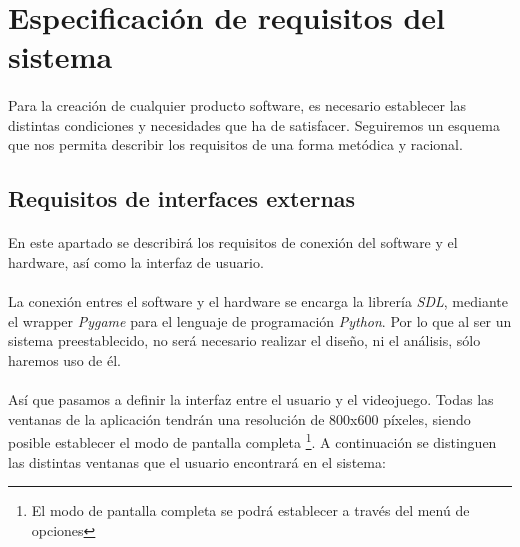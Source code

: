 \section{Especificación de requisitos del sistema}

\paragraph{}
Para la creación de cualquier producto software, es necesario establecer las distintas condiciones y necesidades que
ha de satisfacer. Seguiremos un esquema que nos permita describir los requisitos de una forma metódica y racional.

\subsection{Requisitos de interfaces externas}

\paragraph{}
En este apartado se describirá los requisitos de conexión del software y el hardware, así como la interfaz de usuario.

\paragraph{}
La conexión entres el software y el hardware se encarga la librería \emph{SDL}, mediante el wrapper \emph{Pygame} para 
el lenguaje de programación \emph{Python}. Por lo que al ser un sistema preestablecido, no será necesario realizar el diseño,
ni el análisis, sólo haremos uso de él.

\paragraph{}
Así que pasamos a definir la interfaz entre el usuario y el videojuego. Todas las ventanas de la aplicación tendrán una 
resolución de 800x600 píxeles, siendo posible establecer el modo de pantalla completa \footnote{El modo de pantalla completa
se podrá establecer a través del menú de opciones}. A continuación se distinguen las distintas
ventanas que el usuario encontrará en el sistema:

